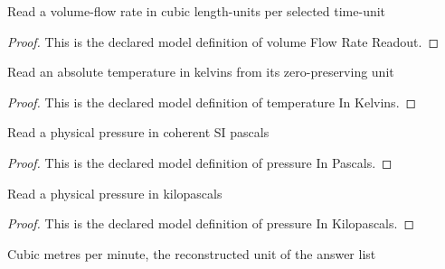\begin{definition}
  \label{def:physics:phyx-mini-0445:phyxminiproblems-problemphyxmini0445-volumeflowratereadout}
  Read a volume-flow rate in cubic length-units per selected time-unit
\end{definition}
\begin{proof}
  This is the declared model definition of volume Flow Rate Readout.
\end{proof}
\begin{definition}
  \label{def:physics:phyx-mini-0445:phyxminiproblems-problemphyxmini0445-temperatureinkelvins}
  Read an absolute temperature in kelvins from its zero-preserving unit
\end{definition}
\begin{proof}
  This is the declared model definition of temperature In Kelvins.
\end{proof}
\begin{definition}
  \label{def:physics:phyx-mini-0445:phyxminiproblems-problemphyxmini0445-pressureinpascals}
  Read a physical pressure in coherent SI pascals
\end{definition}
\begin{proof}
  This is the declared model definition of pressure In Pascals.
\end{proof}
\begin{definition}
  \label{def:physics:phyx-mini-0445:phyxminiproblems-problemphyxmini0445-pressureinkilopascals}
  Read a physical pressure in kilopascals
\end{definition}
\begin{proof}
  This is the declared model definition of pressure In Kilopascals.
\end{proof}
\begin{definition}
  \label{def:physics:phyx-mini-0445:phyxminiproblems-problemphyxmini0445-volumeflowincubicmetersperminute}
  Cubic metres per minute, the reconstructed unit of the answer list
\end{definition}
